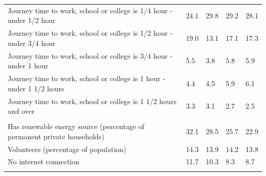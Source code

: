 \documentclass{article}
\begin{document}
\begin{table}[h]
\begin{tabular}{KTTTT}
Journey time to work, school or college is 1/4 hour - under 1/2 hour & 24.1& 29.8& 29.2& 28.1\\
Journey time to work, school or college is 1/2 hour - under 3/4 hour & 19.0& 13.1& 17.1& 17.3\\
Journey time to work, school or college is 3/4 hour - under 1 hour & 5.5& 3.8& 5.8& 5.9\\
Journey time to work, school or college is 1 hour - under 1 1/2 hours & 4.4& 4.5& 5.9& 6.1\\
Journey time to work, school or college is 1 1/2 hours and over & 3.3& 3.1& 2.7& 2.5\\
\hline
    \\ 
    \hline
Has renewable energy source (percentage of permanent private households) & 32.1& 28.5& 25.7& 22.9\\
    \hline
Volunteers (percentage of population) & 14.3& 13.9& 14.2& 13.8\\
    \hline
No internet connection& 11.7& 10.3&  8.3&  8.7\\
\hline
\end{tabular}
\end{table}
\end{document}

